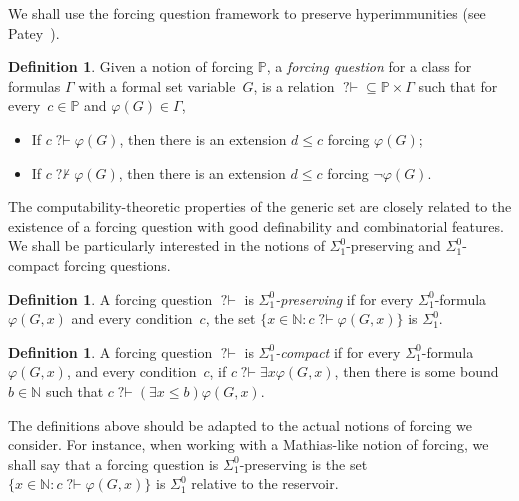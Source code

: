 \documentclass{article}
\def\PP{\mathbb{P}}
\newcommand{\qvdash}{\operatorname{{?}{\vdash}}}
\newcommand{\nqvdash}{\operatorname{{?}{\nvdash}}}
\newcommand{\NN}[0]{\mathbb{N}}
\def\N{\mathbb{N}}
\def\NN{\mathbb{N}}
\def\PP{\mathbb{P}}
\def\PP{\mathbb{P}}
\numberwithin{theorem}{section}
\theoremstyle{definition}
\newtheorem{definition}[theorem]{Definition}
\begin{document}
We shall use the forcing question framework to preserve hyperimmunities (see Patey~\cite[Chapter 3]{pateylowness}). 

\begin{definition}
Given a notion of forcing $\PP$, a \emph{forcing question} for a class for formulas $\Gamma$ with a formal set variable~$G$, is a relation $\qvdash \subseteq \PP \times \Gamma$ such that for every~$c \in \PP$ and $\varphi(G) \in \Gamma$,
\begin{itemize}
    \item[(1)] If $c \qvdash \varphi(G)$, then there is an extension $d \leq c$ forcing $\varphi(G)$;
    \item[(2)] If $c \nqvdash \varphi(G)$, then there is an extension $d \leq c$ forcing $\neg \varphi(G)$.
\end{itemize}
\end{definition}

The computability-theoretic properties of the generic set are closely related to the existence of a forcing question with good definability and combinatorial features. We shall be particularly interested in the notions of $\Sigma^0_1$-preserving and $\Sigma^0_1$-compact forcing questions.

\begin{definition}
A forcing question $\qvdash$ is \emph{$\Sigma^0_1$-preserving} if for every $\Sigma^0_1$-formula $\varphi(G, x)$ and every condition~$c$, the set $\{ x \in \NN : c \qvdash \varphi(G, x) \}$ is $\Sigma^0_1$.
\end{definition}

\begin{definition}
A forcing question $\qvdash$ is \emph{$\Sigma^0_1$-compact} if for every $\Sigma^0_1$-formula $\varphi(G, x)$,
and every condition~$c$, if $c \qvdash \exists x \varphi(G, x)$, then there is some bound~$b \in \NN$ such that $c \qvdash (\exists x \leq b)\varphi(G, x)$.
\end{definition}

The definitions above should be adapted to the actual notions of forcing we consider. For instance, when working with a Mathias-like notion of forcing, we shall say that a forcing question is $\Sigma^0_1$-preserving is the set $\{ x \in \NN : c \qvdash \varphi(G, x) \}$ is $\Sigma^0_1$ relative to the reservoir.


\end{document}

